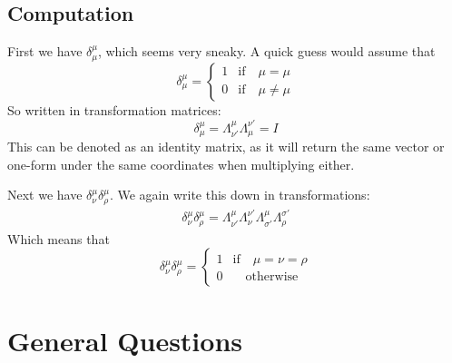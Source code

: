 \documentclass{article}
\begin{document}
		\subsection{Computation}
			First we have $\delta_\mu^\mu$, which seems very sneaky. A quick guess would assume that 
			$$ \delta_\mu^\mu = \begin{cases}
				1 & \text{if} \quad \mu = \mu \\
				0 & \text{if} \quad \mu \neq \mu
			\end{cases}$$
			So written in transformation matrices:
			$$ \delta_\mu^\mu = \Lambda_{\nu'}^\mu \Lambda_\mu^{\nu'}=I$$
			This can be denoted as an identity matrix, as it will return the same vector or one-form under the same coordinates when multiplying either.
			
			Next we have $\delta_\nu^\mu \delta_\rho^\mu$. We again write this down in transformations:
			\begin{align*}
				\delta_\nu^\mu \delta_\rho^\mu = \Lambda_{\nu'}^\mu \Lambda_\nu^{\nu'} \Lambda_{\sigma'}^\mu \Lambda_\rho^{\sigma'}
			\end{align*}
			Which means that
			$$ \delta_\nu^\mu \delta_\rho^\mu = \begin{cases}
				1 & \text{if} \quad \mu = \nu = \rho \\
				0 & \quad \text{otherwise}
			\end{cases}$$
			
		\pagebreak
	\section{General Questions}
\end{document}
